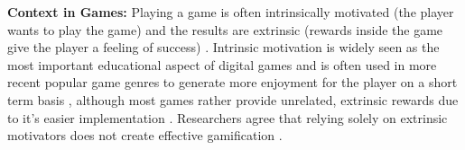 \textbf{Context in Games:}
Playing a game is often intrinsically motivated (the player wants to play the game) and the results are extrinsic (rewards inside the game give the player a feeling of success) \cite{domestic}.
Intrinsic motivation is widely seen as the most important educational aspect of digital games \cite{domestic} and is often used in more recent popular game genres to generate more enjoyment for the player on a short term basis \cite{corners}, although most games rather provide unrelated, extrinsic rewards due to it's easier implementation \cite{fail}.
Researchers agree that relying solely on extrinsic motivators does not create effective gamification \cite{equilibrium}.